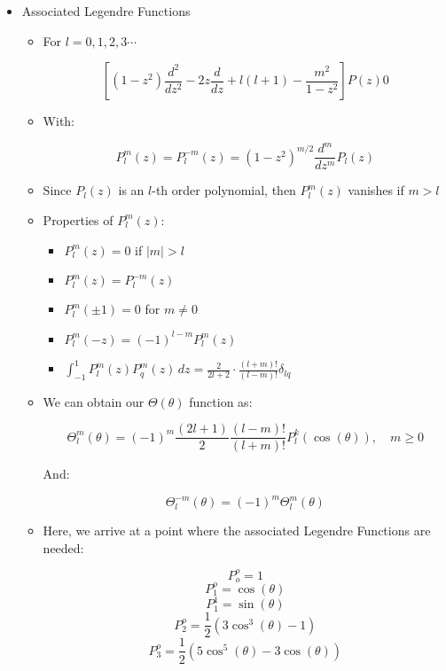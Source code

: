 \begin{itemize}

  \item Associated Legendre Functions

    \begin{itemize}

      \item For $l=0,1,2,3\cdots$

        $$\left[(1-z^2)\frac{d^2}{dz^2}-2z\frac{d}{dz}+l(l+1)-\frac{m^2}{1-z^2}\right]P(z)0$$

      \item With:

        $$P_l^m(z)=P_l^{-m}(z)=(1-z^2)^{m/2}\frac{d^m}{dz^m}P_l(z)$$

      \item Since $P_l(z)$ is an $l$-th order polynomial, then $P_l^m(z)$ vanishes if $m>l$

      \item Properties of $P_l^m(z)$:

        \begin{itemize}

          \item $P_l^m(z)=0$ if $|m|>l$

          \item $P_l^m(z)=P_l^{-m}(z)$

          \item $P_l^m(\pm1)=0$ for $m\neq0$

          \item $P_l^m(-z)=(-1)^{l-m}P_l^{m}(z)$

          \item $\displaystyle \int_{-1}^1 P_l^m(z)P_q^m(z)\,dz=\frac{2}{2l+2}\cdot\frac{(l+m)!}{(l-m)!}\delta_{lq}$

        \end{itemize}

      \item We can obtain our $\Theta(\theta)$ function as:

        $$\Theta_l^m(\theta)=(-1)^m\frac{(2l+1)}{2}\frac{(l-m)!}{(l+m)!}P_l^k(\cos(\theta)),\quad m\geq0$$

        And:

        $$\Theta_l^{-m}(\theta)=(-1)^m\Theta_l^m(\theta)$$

      \item Here, we arrive at a point where the associated Legendre Functions are needed:

        $$P_o^o=1$$
        $$P_1^o=\cos(\theta)$$
        $$P_1^1=\sin(\theta)$$
        $$P_2^o=\frac{1}{2}(3\cos^3(\theta)-1)$$
        $$P_3^o=\frac{1}{2}(5\cos^5(\theta)-3\cos(\theta))$$


\end{itemize}
\end{itemize}
